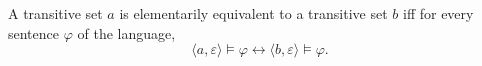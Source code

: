 A transitive set $a$ is elementarily equivalent to a transitive set $b$ iff for every sentence $\varphi$ of the language,
$$\langle a, \varepsilon \rangle \models \varphi \leftrightarrow \langle b, \varepsilon \rangle \models \varphi.$$
